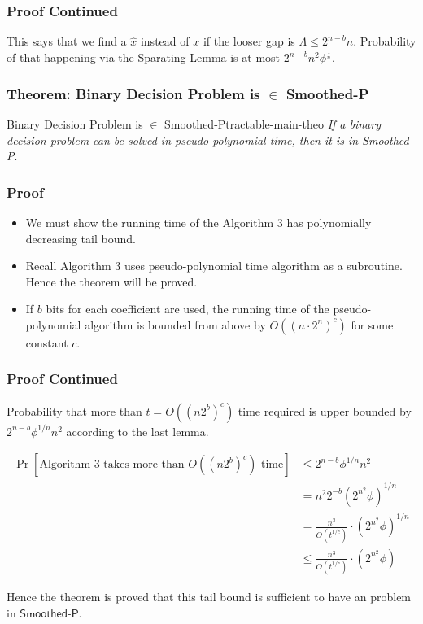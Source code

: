 \begin{frame}
    \frametitle{Proof Continued}

    This says that we find a $\hat{x}$ instead of $x$ if the looser gap is $\Lambda \leq 2^{n - b} n$. Probability of that happening via the Sparating Lemma is at most $2^{n - b} n^2 \phi^{\frac{1}{n}}$.

\end{frame}

\begin{frame}
    \frametitle{Theorem: Binary Decision Problem is $\in$ \textsf{Smoothed-P}}

    
    \begin{theo}{Binary Decision Problem is $\in$ \textsf{Smoothed-P}}{tractable-main-theo}
        \textit{If a binary decision problem can be solved in pseudo-polynomial time,
        then it is in \textsf{Smoothed-P}}.
    \end{theo}

\end{frame}

\begin{frame}
    \frametitle{Proof}

    
    \begin{itemize}
        \item We must show the running time of the Algorithm 3 has polynomially decreasing tail bound.
        \item Recall Algorithm 3 uses pseudo-polynomial time algorithm as a subroutine. Hence the theorem will be proved.
        \item If $b$ bits for each coefficient are used, the running time of the pseudo-polynomial algorithm is bounded from above by $O((n \cdot 2^n) ^c)$ for some constant $c$.
    \end{itemize}
\end{frame}

\begin{frame}
    \frametitle{Proof Continued}

    Probability that more than $t = O((n2^b) ^c)$ time required is upper bounded by $2^{n - b} \phi^{1/n} n^2$ according to the last lemma.

    
    \begin{align*}
        \Pr[\text{Algorithm 3 takes more than } O((n2^b) ^c) \text{ time}] &\leq 2^{n - b} \phi^{1/n} n^2\\
        &= n^2 2^{-b} (2^{n^2} \phi)^{1/n}\\
        &= \frac{n^3}{O(t^{1/c})} \cdot (2^{n^2} \phi)^{1/n}\\
        &\leq \frac{n^3}{O(t^{1/c})} \cdot (2^{n^2} \phi)
    \end{align*}

    Hence the theorem is proved that this tail bound is sufficient to have an problem in $\textsf{Smoothed-P}$.
\end{frame}


